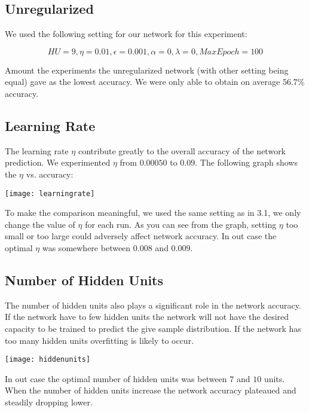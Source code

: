 \documentclass{article}
\begin{document}
\subsection{Unregularized}
We used the following setting for our network for this experiment:

\begin{equation*}
HU=9, \eta=0.01, \epsilon=0.001, \alpha=0, \lambda=0, MaxEpoch=100
\end{equation*}

Amount the experiments the unregularized network (with other setting being equal) gave as the lowest accuracy. We were only able to obtain on average $56.7\%$ accuracy. 

\subsection{Learning Rate}
The learning rate $\eta$ contribute greatly to the overall accuracy of the network prediction. We experimented $\eta$ from $0.00050$ to $0.09$. The following graph shows the $\eta$ vs. accuracy:

\begin{center}
 \texttt{[image: learningrate]}
\end{center}

To make the comparison meaningful, we used the same setting as in 3.1, we only change the value of $\eta$ for each run. As you can see from the graph, setting $\eta$ too small or too large could adversely affect network accuracy. In out case the optimal $\eta$ was somewhere between $0.008$ and $0.009$.

\subsection{Number of Hidden Units}
The number of hidden units also plays a significant role in the network accuracy. If the network have to few hidden units the network will not have the desired capacity to be trained to predict the give sample distribution. If the network has too many hidden units overfitting is likely to occur.

\begin{center}
 \texttt{[image: hiddenunits]}
\end{center}

In out case the optimal number of hidden units was between $7$ and $10$ units. When the number of hidden units increase the network accuracy plateaued and steadily dropping lower. 
\end{document}
